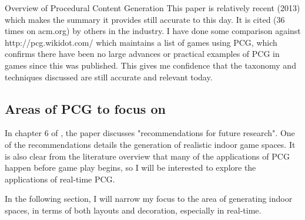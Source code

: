 \documentclass[review]{cmpreport}
\begin{document}
\begin{section}{Overview of Procedural Content Generation}
This paper is relatively recent (2013) which makes the summary it provides still accurate to this day. It is cited (36 times on acm.org) by others in the industry. I have done some comparison against http://pcg.wikidot.com/ which maintains a list of games using PCG, which confirms there have been no large advances or practical examples of PCG in games since this was published. This gives me confidence that the taxonomy and techniques discussed are still accurate and relevant today. \par 

\subsection{Areas of PCG to focus on}
In chapter 6 of \cite{Hendrikx:2013:PCG:2422956.2422957}, the paper discusses "recommendations for future research". One of the recommendations details the generation of realistic indoor game spaces. It is also clear from the literature overview that many of the applications of PCG happen before game play begins, so I will be interested to explore the applications of real-time PCG. \par
In the following section, I will narrow my focus to the area of generating indoor spaces, in terms of both layouts and decoration, especially in real-time.

\end{section}
\end{document}
